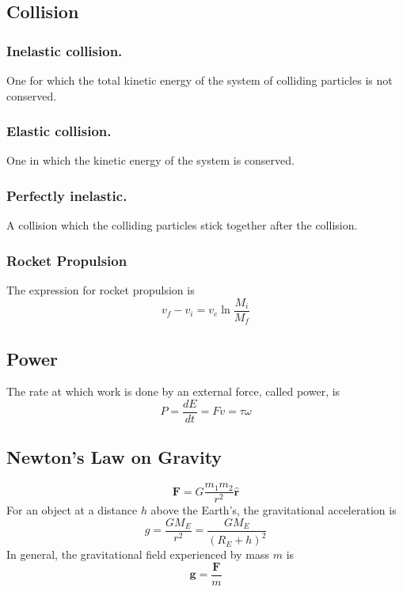 \documentclass[../../../main.tex]{subfiles}
\begin{document}
\subsection*{Collision}
\subsubsection*{Inelastic collision.} One for which the total kinetic energy of the system of colliding particles is not conserved.

\subsubsection*{Elastic collision.} One in which the kinetic energy of the
system is conserved.

\subsubsection*{Perfectly inelastic.} A collision which the colliding particles stick together after the collision.

\subsubsection*{Rocket Propulsion} The expression for rocket propulsion
is 
\begin{equation*}
    v_f-v_i=v_e\ln\frac{M_i}{M_f}
\end{equation*}

\subsection*{Power}
The rate at which work is done by an external force, called power, is
\begin{equation*}
    P=\frac{dE}{dt}=Fv=\tau\omega
\end{equation*}

\subsection*{Newton's Law on Gravity}
\begin{equation*}
    \mathbf{F}=G\frac{m_1m_2}{r^2}\mathbf{\hat{r}}
\end{equation*}
For an object at a distance $h$ above the Earth's, the gravitational acceleration is 
\begin{equation*}
    g=\frac{GM_E}{r^2}=\frac{GM_E}{(R_E+h)^2}
\end{equation*}
In general, the gravitational field experienced by mass $m$ is 
\begin{equation*}
    \mathbf{g}=\frac{\mathbf{F}}{m}
\end{equation*}
\end{document}
